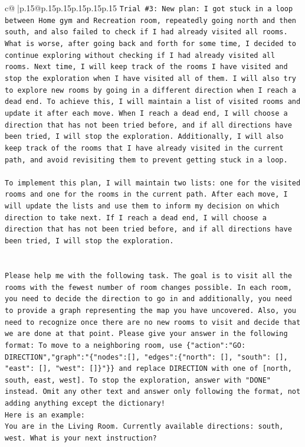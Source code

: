 \documentclass{article}
\begin{document}
{\begin{supertabular}{c@{$\;$}|p{.15\linewidth}@{}p{.15\linewidth}p{.15\linewidth}p{.15\linewidth}p{.15\linewidth}p{.15\linewidth}}
{{{\texttt{Trial \#3: New plan: I got stuck in a loop between Home gym and Recreation room, repeatedly going north and then south, and also failed to check if I had already visited all rooms. What is worse, after going back and forth for some time, I decided to continue exploring without checking if I had already visited all rooms. Next time, I will keep track of the rooms I have visited and stop the exploration when I have visited all of them. I will also try to explore new rooms by going in a different direction when I reach a dead end. To achieve this, I will maintain a list of visited rooms and update it after each move. When I reach a dead end, I will choose a direction that has not been tried before, and if all directions have been tried, I will stop the exploration. Additionally, I will also keep track of the rooms that I have already visited in the current path, and avoid revisiting them to prevent getting stuck in a loop. } \\
\\ 
\texttt{To implement this plan, I will maintain two lists: one for the visited rooms and one for the rooms in the current path. After each move, I will update the lists and use them to inform my decision on which direction to take next. If I reach a dead end, I will choose a direction that has not been tried before, and if all directions have been tried, I will stop the exploration.} \\
\\ 
\\ 
\texttt{Please help me with the following task. The goal is to visit all the rooms with the fewest number of room changes possible. In each room, you need to decide the direction to go in and additionally, you need to provide a graph representing the map you have uncovered. Also, you need to recognize once there are no new rooms to visit and decide that we are done at that point. Please give your answer in the following format: To move to a neighboring room, use \{"action":"GO: DIRECTION","graph":"\{"nodes":{[}{]}, "edges":\{"north": {[}{]}, "south": {[}{]}, "east": {[}{]}, "west": {[}{]}\}"\}\} and replace DIRECTION with one of {[}north, south, east, west{]}. To stop the exploration, answer with "DONE" instead. Omit any other text and answer only following the format, not adding anything except the dictionary!} \\
\texttt{Here is an example: } \\
\texttt{You are in the Living Room. Currently available directions: south, west. What is your next instruction?} \\
}}}
\end{supertabular}}
\end{document}
